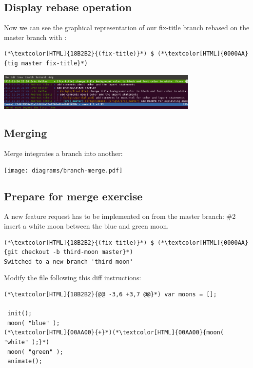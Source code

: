 \subsection{Display rebase operation}
\begin{frame}[fragile]
  \subslidetitle

  Now we can see the graphical representation of our fix-title branch rebased on the master branch with :
  \begin{lstlisting}
(*\textcolor[HTML]{18B2B2}{(fix-title)}*) $ (*\textcolor[HTML]{0000AA}{tig master fix-title}*)
\end{lstlisting}

  \vspace{1em}

  \centerline{\includegraphics[width=10cm]{../screen/tig-fix-title-rebase-master.png}}

\end{frame}

\subsection{Merging}
\begin{frame}[fragile]
  \subslidetitle
  Merge integrates a branch into another:
  \centerline{\texttt{[image: diagrams/branch-merge.pdf]}}
\end{frame}

\subsection{Prepare for merge exercise}
\begin{frame}[fragile]
  \subslidetitle

  A new feature request has to be implemented on from the master branch:
  \newline \vspace{1em}
  \#2 insert a white moon between the blue and green moon.
  \begin{lstlisting}
(*\textcolor[HTML]{18B2B2}{(fix-title)}*) $ (*\textcolor[HTML]{0000AA}{git checkout -b third-moon master}*)
Switched to a new branch 'third-moon'
\end{lstlisting}

  Modify the  file following this diff instructions:
  \begin{lstlisting}
(*\textcolor[HTML]{18B2B2}{@@ -3,6 +3,7 @@}*) var moons = [];

 init();
 moon( "blue" );
(*\textcolor[HTML]{00AA00}{+}*)(*\textcolor[HTML]{00AA00}{moon( "white" );}*)
 moon( "green" );
 animate();
\end{lstlisting}
\end{frame}


